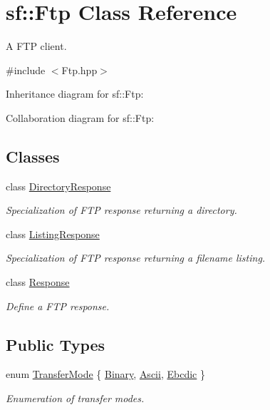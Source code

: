 \hypertarget{classsf_1_1_ftp}{}\section{sf\+:\+:Ftp Class Reference}
\label{classsf_1_1_ftp}


A F\+TP client.  




{\ttfamily \#include $<$Ftp.\+hpp$>$}



Inheritance diagram for sf\+:\+:Ftp\+:


Collaboration diagram for sf\+:\+:Ftp\+:
\subsection*{Classes}
\begin{DoxyCompactItemize}
\item 
class \hyperlink{classsf_1_1_ftp_1_1_directory_response}{Directory\+Response}
\begin{DoxyCompactList}\small\item\em Specialization of F\+TP response returning a directory. \end{DoxyCompactList}\item 
class \hyperlink{classsf_1_1_ftp_1_1_listing_response}{Listing\+Response}
\begin{DoxyCompactList}\small\item\em Specialization of F\+TP response returning a filename listing. \end{DoxyCompactList}\item 
class \hyperlink{classsf_1_1_ftp_1_1_response}{Response}
\begin{DoxyCompactList}\small\item\em Define a F\+TP response. \end{DoxyCompactList}\end{DoxyCompactItemize}
\subsection*{Public Types}
\begin{DoxyCompactItemize}
\item 
enum \hyperlink{classsf_1_1_ftp_a1cd6b89ad23253f6d97e6d4ca4d558cb}{Transfer\+Mode} \{ \hyperlink{classsf_1_1_ftp_a1cd6b89ad23253f6d97e6d4ca4d558cba6f253b362639fb5e059dc292762a21ee}{Binary}, 
\hyperlink{classsf_1_1_ftp_a1cd6b89ad23253f6d97e6d4ca4d558cbac9e544a22dce8ef3177449cb235d15c2}{Ascii}, 
\hyperlink{classsf_1_1_ftp_a1cd6b89ad23253f6d97e6d4ca4d558cbabb1e34435231e73c96534c71090be7f4}{Ebcdic}
 \}\begin{DoxyCompactList}\small\item\em Enumeration of transfer modes. \end{DoxyCompactList}
\end{DoxyCompactItemize}
